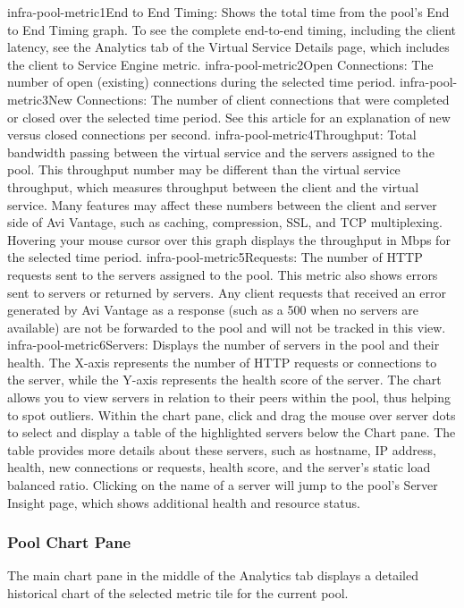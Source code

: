 \documentclass[letterpaper,10pt,english]{sphinxmanual}
\begin{document}
infra-pool-metric1End to End Timing: Shows the total time from the pool's End to End Timing graph. To see the complete end-to-end timing, including the client latency, see the Analytics tab of the Virtual Service Details page, which includes the client to Service Engine metric.
infra-pool-metric2Open Connections: The number of open (existing) connections during the selected time period.
infra-pool-metric3New Connections: The number of client connections that were completed or closed over the selected time period. See this article for an explanation of new versus closed connections per second.
infra-pool-metric4Throughput: Total bandwidth passing between the virtual service and the servers assigned to the pool. This throughput number may be different than the virtual service throughput, which measures throughput between the client and the virtual service. Many features may affect these numbers between the client and server side of Avi Vantage, such as caching, compression, SSL, and TCP multiplexing. Hovering your mouse cursor over this graph displays the throughput in Mbps for the selected time period.
infra-pool-metric5Requests: The number of HTTP requests sent to the servers assigned to the pool. This metric also shows errors sent to servers or returned by servers. Any client requests that received an error generated by Avi Vantage as a response (such as a 500 when no servers are available) are not be forwarded to the pool and will not be tracked in this view.
infra-pool-metric6Servers: Displays the number of servers in the pool and their health. The X-axis represents the number of HTTP requests or connections to the server, while the Y-axis represents the health score of the server. The chart allows you to view servers in relation to their peers within the pool, thus helping to spot outliers. Within the chart pane, click and drag the mouse over server dots to select and display a table of the highlighted servers below the Chart pane. The table provides more details about these servers, such as hostname, IP address, health, new connections or requests, health score, and the server’s static load balanced ratio. Clicking on the name of a server will jump to the pool's Server Insight page, which shows additional health and resource status.


\subsubsection{Pool Chart Pane}
\label{\detokenize{getting_started/pool:pool-chart-pane}}
The main chart pane in the middle of the Analytics tab displays a detailed historical chart of the selected metric tile for the current pool.
\end{document}
